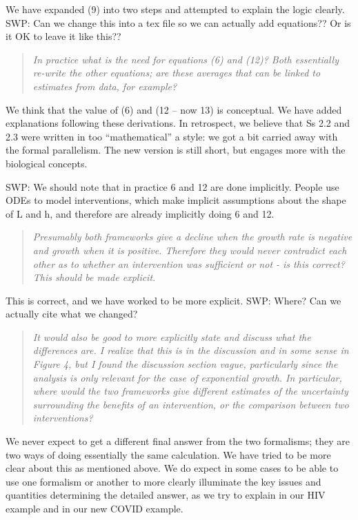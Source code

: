 We have expanded (9) into two steps and attempted to explain the logic
clearly. SWP: Can we change this into a tex file so we can actually add
equations?? Or is it OK to leave it like this??

\begin{quote}\sl
In practice what is the need for equations (6) and (12)? Both
essentially re-write the other equations; are these averages that can be
linked to estimates from data, for example?
\end{quote}

We think that the value of (6) and (12 -- now 13) is conceptual. We have
added explanations following these derivations. In retrospect, we
believe that Ss 2.2 and 2.3 were written in too ``mathematical'' a
style: we got a bit carried away with the formal parallelism. The new
version is still short, but engages more with the biological concepts.

SWP: We should note that in practice 6 and 12 are done implicitly.
People use ODEs to model interventions, which make implicit assumptions
about the shape of L and h, and therefore are already implicitly doing 6
and 12.

\begin{quote}\sl
Presumably both frameworks give a decline when the growth rate is
negative and growth when it is positive. Therefore they would never
contradict each other as to whether an intervention was sufficient or
not - is this correct? This should be made explicit.
\end{quote}

This is correct, and we have worked to be more explicit. SWP: Where? Can
we actually cite what we changed?

\begin{quote}\sl
It would also be good to more explicitly state and discuss what the
differences are. I realize that this is in the discussion and in some
sense in Figure 4, but I found the discussion section vague,
particularly since the analysis is only relevant for the case of
exponential growth. In particular, where would the two frameworks give
different estimates of the uncertainty surrounding the benefits of an
intervention, or the comparison between two interventions?
\end{quote}

We never expect to get a different final answer from the two formalisms;
they are two ways of doing essentially the same calculation. We have
tried to be more clear about this as mentioned above. We do expect in
some cases to be able to use one formalism or another to more clearly
illuminate the key issues and quantities determining the detailed
answer, as we try to explain in our HIV example and in our new COVID
example.


